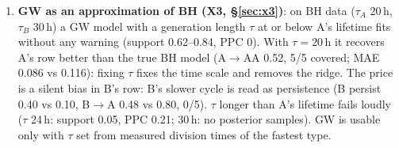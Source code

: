 \documentclass[10pt,a4paper]{article}
\newcommand{\tA}{$\tau_A$}
\newcommand{\tB}{$\tau_B$}
\begin{document}
\begin{enumerate}[resume,leftmargin=1.4em]
\item \textbf{GW as an approximation of BH (X3, \S\ref{sec:x3})}: on BH data (\tA{} 20\,h, \tB{} 30\,h) a GW model with a generation length $\tau$ at or below A's lifetime fits without any warning (support 0.62--0.84, PPC 0). With $\tau = 20$\,h it recovers A's row better than the true BH model (A$\to$AA 0.52, 5/5 covered; MAE 0.086 vs 0.116): fixing $\tau$ fixes the time scale and removes the ridge. The price is a silent bias in B's row: B's slower cycle is read as persistence (B persist 0.40 vs 0.10, B$\to$A 0.48 vs 0.80, 0/5). $\tau$ longer than A's lifetime fails loudly ($\tau$ 24\,h: support 0.05, PPC 0.21; 30\,h: no posterior samples). GW is usable only with $\tau$ set from measured division times of the fastest type.
\end{enumerate}
\end{document}
